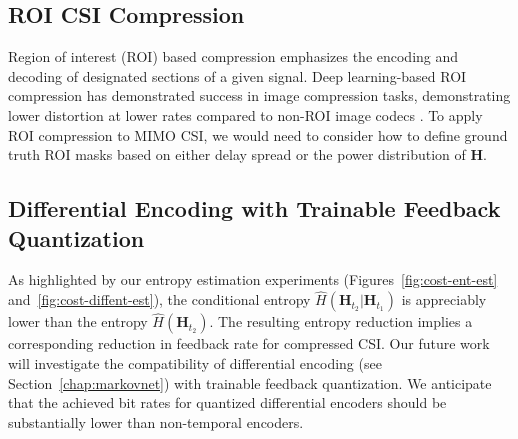 \subsection{ROI CSI Compression}

Region of interest (ROI) based compression emphasizes the encoding and decoding of designated sections of a given signal. Deep learning-based ROI compression has demonstrated success in image compression tasks, demonstrating lower distortion at lower rates compared to non-ROI image codecs \cite{ref:Cai2020EndToEndOptimizedROIImageCompression}. To apply ROI compression to MIMO CSI, we would need to consider how to define ground truth ROI masks based on either delay spread or the power distribution of $\mathbf H$.

\subsection{Differential Encoding with Trainable Feedback Quantization}

As highlighted by our entropy estimation experiments (Figures~\ref{fig:cost-ent-est} and~\ref{fig:cost-diffent-est}), the conditional entropy $\hat H(\mathbf H_{t_2}|\mathbf H_{t_1})$ is appreciably lower than the entropy $\hat H(\mathbf H_{t_2})$. The resulting entropy reduction implies a corresponding reduction in feedback rate for compressed CSI. Our future work will investigate the compatibility of differential encoding (see Section~\ref{chap:markovnet}) with trainable feedback quantization. We anticipate that the achieved bit rates for quantized differential encoders should be substantially lower than non-temporal encoders.

